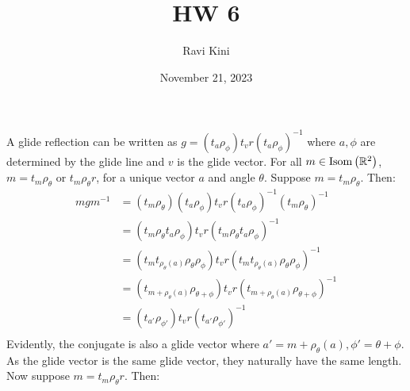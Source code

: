\documentclass{article}
\title{HW 6}
\author{Ravi Kini}
\date{November 21, 2023}
\begin{document}
\maketitle

A glide reflection can be written as $g = \left(t_a\rho_{\phi}\right)t_vr\left(t_a\rho_{\phi}\right)^{-1}$ where $a, \phi$ are determined by the glide line and $v$ is the glide vector. For all $m \in \mathrm{Isom}\left(\mathbb{R}^2\right)$, $m = t_m\rho_{\theta}$ or $t_m\rho_{\theta}r$, for a unique vector $a$ and angle $\theta$. Suppose $m = t_m\rho_{\theta}$. Then:
\begin{equation}
    \begin{split}
        mgm^{-1} & = \left(t_m\rho_{\theta}\right)\left(t_a\rho_{\phi}\right)t_vr\left(t_a\rho_{\phi}\right)^{-1}\left(t_m\rho_{\theta}\right)^{-1} \\
        & = \left(t_m\rho_{\theta}t_a\rho_{\phi}\right)t_vr\left(t_m\rho_{\theta}t_a\rho_{\phi}\right)^{-1} \\
        & = \left(t_mt_{\rho_{\theta}\left(a\right)}\rho_{\theta}\rho_{\phi}\right)t_vr\left(t_mt_{\rho_{\theta}\left(a\right)}\rho_{\theta}\rho_{\phi}\right)^{-1} \\
        & = \left(t_{m + \rho_{\theta}\left(a\right)}\rho_{\theta + \phi}\right)t_vr\left(t_{m + \rho_{\theta}\left(a\right)}\rho_{\theta + \phi}\right)^{-1} \\
        & = \left(t_{a'}\rho_{\phi'}\right)t_vr\left(t_{a'}\rho_{\phi'}\right)^{-1} \\
    \end{split}
\end{equation}
Evidently, the conjugate is also a glide vector where $a' = m + \rho_{\theta}\left(a\right), \phi' = \theta + \phi$. As the glide vector is the same glide vector, they naturally have the same length. Now suppose $m = t_m\rho_{\theta}r$. Then:
\end{document}
